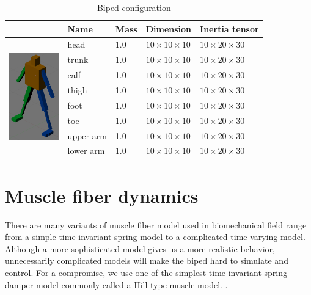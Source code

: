 \documentclass[master,english,final]{kaist-ucs}
\begin{document}
\begin{table}[h!]
\centering
  \begin{tabular}{cllll}
                                                             & Name      & Mass  & Dimension                & Inertia tensor           \\
      \hline
      \multirow{8}{*}{\includegraphics[width=0.85in]{biped}} & head      & 1.0   & $10 \times 10 \times 10$ & $10 \times 20 \times 30$ \\
                                                             & trunk     & 1.0   & $10 \times 10 \times 10$ & $10 \times 20 \times 30$ \\
                                                             & calf      & 1.0   & $10 \times 10 \times 10$ & $10 \times 20 \times 30$ \\
                                                             & thigh     & 1.0   & $10 \times 10 \times 10$ & $10 \times 20 \times 30$ \\
                                                             & foot      & 1.0   & $10 \times 10 \times 10$ & $10 \times 20 \times 30$ \\
                                                             & toe       & 1.0   & $10 \times 10 \times 10$ & $10 \times 20 \times 30$ \\
                                                             & upper arm & 1.0   & $10 \times 10 \times 10$ & $10 \times 20 \times 30$ \\
                                                             & lower arm & 1.0   & $10 \times 10 \times 10$ & $10 \times 20 \times 30$ \\
  \hline
\end{tabular}
\caption{Biped configuration}
\end{table}


\section{Muscle fiber dynamics}

There are many variants of muscle fiber model used in biomechanical field range
from a simple time-invariant spring model to a complicated time-varying model. \cite{25733}
Although a more sophisticated model gives us a more realistic behavior, unnecessarily
complicated models will make the biped hard to simulate and control.
For a compromise, we use one of the simplest time-invariant spring-damper model commonly called
a Hill type muscle model. \cite{hill}.
\end{document}
